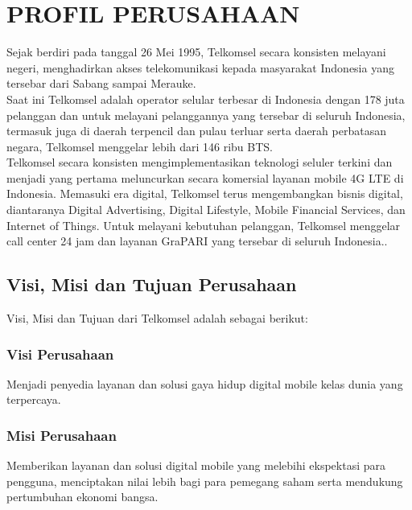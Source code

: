 \chapter{PROFIL PERUSAHAAN}
\tab Sejak berdiri pada tanggal 26 Mei 1995, Telkomsel secara konsisten melayani negeri, menghadirkan akses telekomunikasi kepada masyarakat Indonesia yang tersebar dari Sabang sampai Merauke. \\
\tab Saat ini Telkomsel adalah operator selular terbesar di Indonesia dengan 178 juta pelanggan dan untuk melayani pelanggannya yang tersebar di seluruh Indonesia, termasuk juga di daerah terpencil dan pulau terluar serta daerah perbatasan negara, Telkomsel menggelar lebih dari 146 ribu BTS. \\
\tab Telkomsel secara konsisten mengimplementasikan teknologi seluler terkini dan menjadi yang pertama meluncurkan secara komersial layanan mobile 4G LTE di Indonesia. Memasuki era digital, Telkomsel terus mengembangkan bisnis digital, diantaranya Digital Advertising, Digital Lifestyle, Mobile Financial Services, dan Internet of Things. Untuk melayani kebutuhan pelanggan, Telkomsel menggelar call center 24 jam dan layanan GraPARI yang tersebar di seluruh Indonesia.\cite{telkomsel}.
\section{Visi, Misi dan Tujuan Perusahaan}
Visi, Misi dan Tujuan dari Telkomsel adalah sebagai berikut:
	\subsection{Visi Perusahaan}
	Menjadi penyedia layanan dan solusi gaya hidup digital mobile kelas dunia yang terpercaya.
	\subsection{Misi Perusahaan}
	Memberikan layanan dan solusi digital mobile yang melebihi ekspektasi para pengguna, menciptakan nilai lebih bagi para pemegang saham serta mendukung pertumbuhan ekonomi bangsa.\cite{aboutus}

